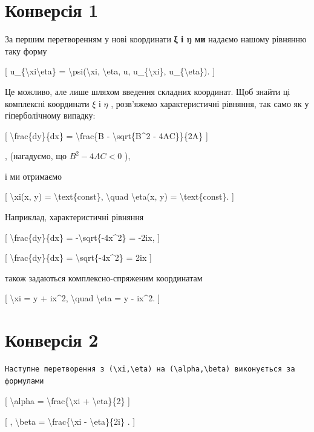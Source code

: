 \documentclass[
]{article}
\begin{document}
\section{Конверсія
1}\label{ux43aux43eux43dux432ux435ux440ux441ux456ux44f-1}

За першим перетворенням у нові координати \textbf{ξ і ŋ ми} надаємо
нашому рівнянню таку форму

{[} u\_\{\textbackslash xi\textbackslash eta\} =
\textbackslash psi(\textbackslash xi, \textbackslash eta, u,
u\_\{\textbackslash xi\}, u\_\{\textbackslash eta\}). {]}

Це можливо, але лише шляхом введення складних координат. Щоб знайти ці
комплексні координати \(\xi\) і \(\eta\) , розв'яжемо характеристичні
рівняння, так само як у гіперболічному випадку:

{[} \textbackslash frac\{dy\}\{dx\} = \textbackslash frac\{B -
\textbackslash sqrt\{B\^{}2 - 4AC\}\}\{2A\} {]}

, (нагадуємо, що \(B^2 - 4AC < 0\) ),

і ми отримаємо

{[} \textbackslash xi(x, y) = \textbackslash text\{const\},
\textbackslash quad \textbackslash eta(x, y) =
\textbackslash text\{const\}. {]}

Наприклад, характеристичні рівняння

{[} \textbackslash frac\{dy\}\{dx\} = -\textbackslash sqrt\{-4x\^{}2\} =
-2ix, {]}

{[} \textbackslash frac\{dy\}\{dx\} = \textbackslash sqrt\{-4x\^{}2\} =
2ix {]}

також задаються комплексно-спряженим координатам

{[} \textbackslash xi = y + ix\^{}2, \textbackslash quad
\textbackslash eta = y - ix\^{}2. {]}

\section{Конверсія
2}\label{ux43aux43eux43dux432ux435ux440ux441ux456ux44f-2}

\begin{verbatim}
Наступне перетворення з (\xi,\eta) на (\alpha,\beta) виконується за формулами
\end{verbatim}

{[} \textbackslash alpha = \textbackslash frac\{\textbackslash xi +
\textbackslash eta\}\{2\} {]}

{[} , \textbackslash beta = \textbackslash frac\{\textbackslash xi -
\textbackslash eta\}\{2i\} . {]}
\end{document}
